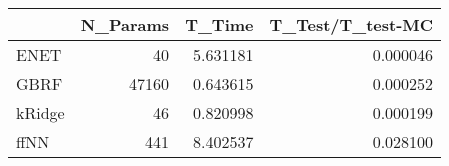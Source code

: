 \begin{tabular}{lrrr}
\toprule
{} &  N\_Params &    T\_Time &  T\_Test/T\_test-MC \\
\midrule
ENET   &        40 &  5.631181 &          0.000046 \\
GBRF   &     47160 &  0.643615 &          0.000252 \\
kRidge &        46 &  0.820998 &          0.000199 \\
ffNN   &       441 &  8.402537 &          0.028100 \\
\bottomrule
\end{tabular}
